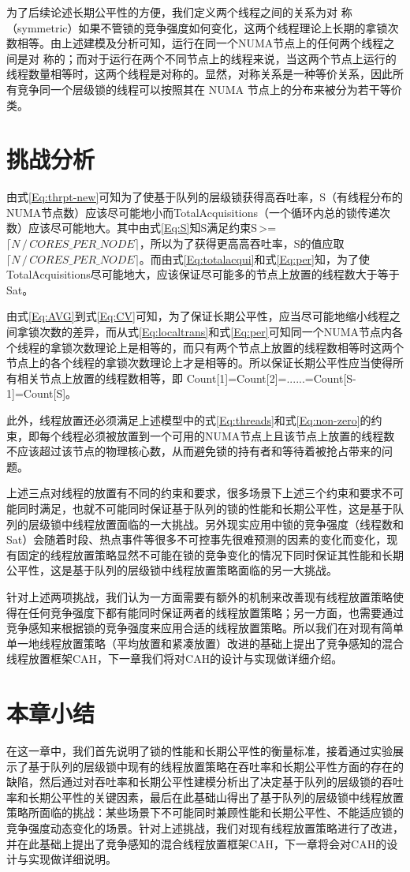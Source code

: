 为了后续论述长期公平性的方便，我们定义两个线程之间的关系为对 称（symmetric）如果不管锁的竞争强度如何变化，这两个线程理论上长期的拿锁次数相等。由上述建模及分析可知，运行在同一个NUMA节点上的任何两个线程之间是对 称的；而对于运行在两个不同节点上的线程来说，当这两个节点上运行的线程数量相等时，这两个线程是对称的。显然，对称关系是一种等价关系，因此所有竞争同一个层级锁的线程可以按照其在 NUMA 节点上的分布来被分为若干等价类。

\section{挑战分析}

由式\ref{Eq:thrpt-new}可知为了使基于队列的层级锁获得高吞吐率，S（有线程分布的NUMA节点数）应该尽可能地小而TotalAcquisitions（一个循环内总的锁传递次数）应该尽可能地大。其中由式\ref{Eq:S}知S满足约束S\,>=\,$\lceil N\,/\,CORES\_PER\_NODE\rceil$，所以为了获得更高高吞吐率，S的值应取$\lceil N\,/\,CORES\_PER\_NODE\rceil$。而由式\ref{Eq:totalacqui}和式\ref{Eq:per}知，为了使TotalAcquisitions尽可能地大，应该保证尽可能多的节点上放置的线程数大于等于Sat。

由式\ref{Eq:AVG}到式\ref{Eq:CV}可知，为了保证长期公平性，应当尽可能地缩小线程之间拿锁次数的差异，而从式\ref{Eq:localtrans}和式\ref{Eq:per}可知同一个NUMA节点内各个线程的拿锁次数理论上是相等的，而只有两个节点上放置的线程数相等时这两个节点上的各个线程的拿锁次数理论上才是相等的。所以保证长期公平性应当使得所有相关节点上放置的线程数相等，即 Count[1]=Count[2]=......=Count[S-1]=Count[S]。
    
此外，线程放置还必须满足上述模型中的式\ref{Eq:threads}和式\ref{Eq:non-zero}的约束，即每个线程必须被放置到一个可用的NUMA节点上且该节点上放置的线程数不应该超过该节点的物理核心数，从而避免锁的持有者和等待着被抢占带来的问题。

上述三点对线程的放置有不同的约束和要求，很多场景下上述三个约束和要求不可能同时满足，也就不可能同时保证基于队列的锁的性能和长期公平性，这是基于队列的层级锁中线程放置面临的一大挑战。另外现实应用中锁的竞争强度（线程数和Sat）会随着时段、热点事件等很多不可控事先很难预测的因素的变化而变化，现有固定的线程放置策略显然不可能在锁的竞争变化的情况下同时保证其性能和长期公平性，这是基于队列的层级锁中线程放置策略面临的另一大挑战。

针对上述两项挑战，我们认为一方面需要有额外的机制来改善现有线程放置策略使得在任何竞争强度下都有能同时保证两者的线程放置策略；另一方面，也需要通过竞争感知来根据锁的竞争强度来应用合适的线程放置策略。所以我们在对现有简单单一地线程放置策略（平均放置和紧凑放置）改进的基础上提出了竞争感知的混合线程放置框架CAH，下一章我们将对CAH的设计与实现做详细介绍。


\section{本章小结}
在这一章中，我们首先说明了锁的性能和长期公平性的衡量标准，接着通过实验展示了基于队列的层级锁中现有的线程放置策略在吞吐率和长期公平性方面的存在的缺陷，然后通过对吞吐率和长期公平性建模分析出了决定基于队列的层级锁的吞吐率和长期公平性的关键因素，最后在此基础山得出了基于队列的层级锁中线程放置策略所面临的挑战：某些场景下不可能同时兼顾性能和长期公平性、不能适应锁的竞争强度动态变化的场景。针对上述挑战，我们对现有线程放置策略进行了改进，并在此基础上提出了竞争感知的混合线程放置框架CAH，下一章将会对CAH的设计与实现做详细说明。